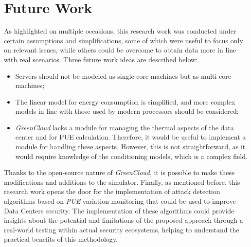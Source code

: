 \section{Future Work}
As highlighted on multiple occasions, this research work was conducted under certain assumptions and simplifications, some of which were useful to focus only on relevant issues, while others could be overcome to obtain data more in line with real scenarios. Three future work ideas are described below:
\begin{itemize}
\item Servers should not be modeled as single-core machines but as multi-core machines;
\item The linear model for energy consumption is simplified, and more complex models in line with those used by modern processors should be considered;
\item \emph{GreenCloud} lacks a module for managing the thermal aspects of the data center and for PUE calculation. Therefore, it would be useful to implement a module for handling these aspects. However, this is not straightforward, as it would require knowledge of the conditioning models, which is a complex field.
\end{itemize}
Thanks to the open-source nature of \emph{GreenCloud}, it is possible to make these modifications and additions to the simulator. Finally, as mentioned before, this research work opens the door for the implementation of attack detection algorithms based on \emph{PUE} variation monitoring that could be used to improve Data Centers security. The implementation of these algorithms could provide insights about the potential and limitations of the proposed approach through a real-world testing within actual security ecosystems, helping to understand the practical benefits of this methodology.
